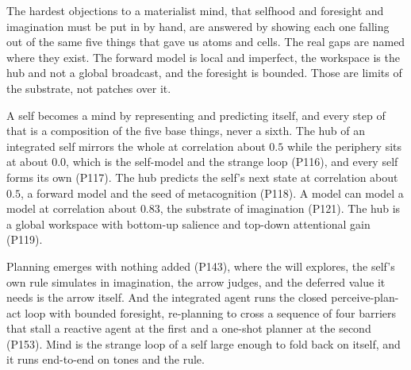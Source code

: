 The hardest objections to a materialist mind, that selfhood and foresight and imagination must be put in by hand, are answered by showing each one falling out of the same five things that gave us atoms and cells. The real gaps are named where they exist. The forward model is local and imperfect, the workspace is the hub and not a global broadcast, and the foresight is bounded. Those are limits of the substrate, not patches over it.

A self becomes a mind by representing and predicting itself, and every step of that is a composition of the five base things, never a sixth. The hub of an integrated self mirrors the whole at correlation about $0.5$ while the periphery sits at about $0.0$, which is the self-model and the strange loop (P116), and every self forms its own (P117). The hub predicts the self's next state at correlation about $0.5$, a forward model and the seed of metacognition (P118). A model can model a model at correlation about $0.83$, the substrate of imagination (P121). The hub is a global workspace with bottom-up salience and top-down attentional gain (P119).

Planning emerges with nothing added (P143), where the will explores, the self's own rule simulates in imagination, the arrow judges, and the deferred value it needs is the arrow itself. And the integrated agent runs the closed perceive-plan-act loop with bounded foresight, re-planning to cross a sequence of four barriers that stall a reactive agent at the first and a one-shot planner at the second (P153). Mind is the strange loop of a self large enough to fold back on itself, and it runs end-to-end on tones and the rule.
